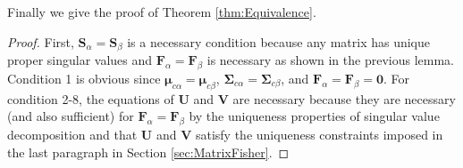 \documentclass[12pt]{article}
\begin{document}
Finally we give the proof of Theorem \ref{thm:Equivalence}.
\begin{proof}
	First, $\mathbf{S}_\alpha=\mathbf{S}_\beta$ is a necessary condition because any matrix has unique proper singular values and $\mathbf{F}_\alpha=\mathbf{F}_\beta$ is necessary as shown in the previous lemma.
	Condition 1 is obvious since $\bm{\mu}_{c\alpha}=\bm{\mu}_{c\beta}$, $\mathbf{\Sigma}_{c\alpha}=\mathbf{\Sigma}_{c\beta}$, and $\mathbf{F}_\alpha=\mathbf{F}_\beta=\mathbf{0}$.
	For condition 2-8, the equations of $\mathbf{U}$ and $\mathbf{V}$ are necessary because they are necessary (and also sufficient) for $\mathbf{F}_\alpha=\mathbf{F}_\beta$ by the uniqueness properties of singular value decomposition and that $\mathbf{U}$ and $\mathbf{V}$ satisfy the uniqueness constraints imposed in the last paragraph in Section \ref{sec:MatrixFisher}.
	

\end{proof}
\end{document}
